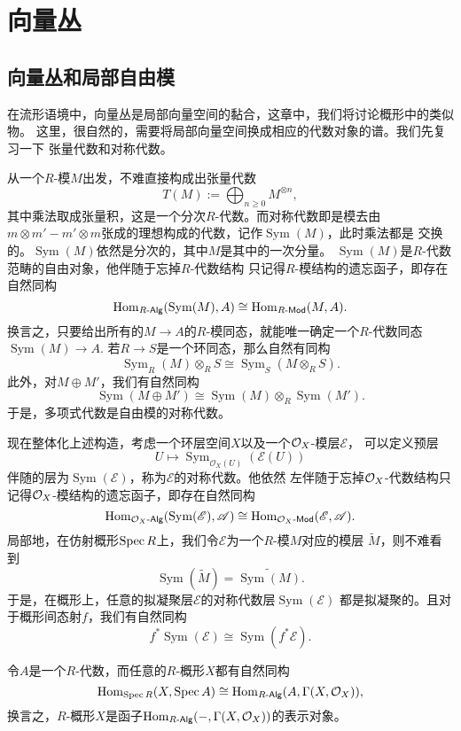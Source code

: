 \chapter{向量丛}

\section{向量丛和局部自由模}

在流形语境中，向量丛是局部向量空间的黏合，这章中，我们将讨论概形中的类似物。
这里，很自然的，需要将局部向量空间换成相应的代数对象的谱。我们先复习一下
张量代数和对称代数。

\para[对称代数]
从一个$R$-模$M$出发，不难直接构成出张量代数
\[
    T(M):=\bigoplus_{n\geq 0}M^{\otimes n},
\]
其中乘法取成张量积，这是一个分次$R$-代数。而对称代数即是模去由$m\otimes m'-
m'\otimes m$张成的理想构成的代数，记作$\operatorname{Sym}(M)$，此时乘法都是
交换的。$\operatorname{Sym}(M)$依然是分次的，其中$M$是其中的一次分量。
$\operatorname{Sym}(M)$是$R$-代数范畴的自由对象，他伴随于忘掉$R$-代数结构
只记得$R$-模结构的遗忘函子，即存在自然同构
\[
    \operatorname{Hom}_{R\text{-}\mathsf{Alg}}(\operatorname{Sym}(M),A)\cong
    \operatorname{Hom}_{R\text{-}\mathsf{Mod}}(M,A).
\]
换言之，只要给出所有的$M\to A$的$R$-模同态，就能唯一确定一个$R$-代数同态
$\operatorname{Sym}(M)\to A$. 若$R\to S$是一个环同态，那么自然有同构
\[
    \operatorname{Sym}_R(M)\otimes_R S\cong \operatorname{Sym}_S(M\otimes_R S).
\]
此外，对$M\oplus M'$，我们有自然同构
\[
    \operatorname{Sym}(M\oplus M')\cong \operatorname{Sym}(M)\otimes_R
    \operatorname{Sym}(M').
\]
于是，多项式代数是自由模的对称代数。

现在整体化上述构造，考虑一个环层空间$X$以及一个$\mathcal{O}_X$-模层$\mathscr E$，
可以定义预层
\[
    U\mapsto
    \operatorname{Sym}_{\mathscr{O}_X(U)}(\mathscr E(U))
\]
伴随的层为$\operatorname{Sym}(\mathscr E)$，称为$\mathscr E$的对称代数。他依然
左伴随于忘掉$\mathcal{O}_X$-代数结构只记得$\mathcal{O}_X$-模结构的遗忘函子，即存在自然同构
\[
    \operatorname{Hom}_{\mathcal{O}_X\text{-}\mathsf{Alg}}(\operatorname{Sym}(\mathscr E),\mathscr A)\cong
    \operatorname{Hom}_{\mathcal{O}_X\text{-}\mathsf{Mod}}(\mathscr E,\mathscr A).
\]
局部地，在仿射概形$\operatorname{Spec} R$上，我们令$\mathscr E$为一个$R$-模$M$对应的模层
$\tilde M$，则不难看到
\[
    \operatorname{Sym}(\tilde M)=\widetilde{\operatorname{Sym}(M)}.
\]
于是，在概形上，任意的拟凝聚层$\mathscr E$的对称代数层$\operatorname{Sym}(\mathscr E)$
都是拟凝聚的。且对于概形间态射$f$，我们有自然同构
\[
    f^*\operatorname{Sym}(\mathscr E)\cong \operatorname{Sym}(f^*\mathscr E).
\]

\para[整体$\spec$] 令$A$是一个$R$-代数，而任意的$R$-概形$X$都有自然同构
\[
    \operatorname{Hom}_{\operatorname{Spec} R}(X,\operatorname{Spec} A)\cong \operatorname{Hom}_{R\text{-}\mathsf{Alg}}(A,\Gamma(X,\mathcal{O}_X)),
\]
换言之，$R$-概形$X$是函子$\operatorname{Hom}_{R\text{-}\mathsf{Alg}}(-,\Gamma(X,\mathcal{O}_X))$的表示对象。

